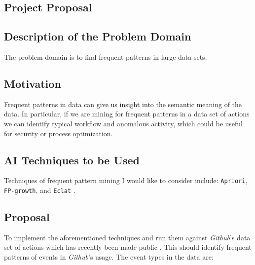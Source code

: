 \documentclass[11pt]{article}
\newcounter{problem}
\theoremstyle{definition}
\begin{document}
\begin{multicols}{2}

\section*{Project Proposal}

\subsection*{Description of the Problem Domain}

The problem domain is to find frequent patterns in large data sets.

\subsection*{Motivation}

Frequent patterns in data can give us insight into the semantic
meaning of the data.  In particular, if we are mining for frequent
patterns in a data set of actions we can identify typical workflow and
anomalous activity, which could be useful for security or process
optimization.

\subsection*{AI Techniques to be Used}

Techniques of frequent pattern mining I would like to consider
include: \texttt{Apriori}, \texttt{FP-growth}, and \texttt{Eclat}
\cite{Han2007,fpmlecture}.

\subsection*{Proposal}

To implement the aforementioned techniques and run them against
\emph{Github}'s data set of actions which has recently been made
public \cite{gharchive}.  This should identify frequent patterns of
events in \emph{Github}'s usage.  The event types in the data are:


\end{multicols}
\end{document}
